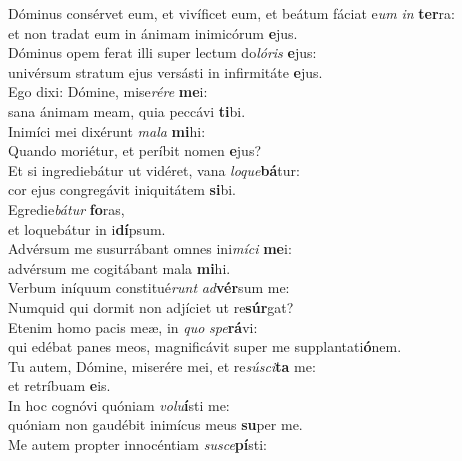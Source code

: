 \evenverse Dóminus consérvet eum, et vivíficet eum, et beátum fáciat e\textit{um} \textit{in} \textbf{ter}ra:~\*\\
\evenverse et non tradat eum in ánimam inimicórum \textbf{e}jus.\\
\oddverse Dóminus opem ferat illi super lectum do\textit{ló}\textit{ris} \textbf{e}jus:~\*\\
\oddverse univérsum stratum ejus versásti in infirmitáte \textbf{e}jus.\\
\evenverse Ego dixi: Dómine, mise\textit{ré}\textit{re} \textbf{me}i:~\*\\
\evenverse sana ánimam meam, quia peccávi \textbf{ti}bi.\\
\oddverse Inimíci mei dixérunt \textit{ma}\textit{la} \textbf{mi}hi:~\*\\
\oddverse Quando moriétur, et períbit nomen \textbf{e}jus?\\
\evenverse Et si ingrediebátur ut vidéret, vana \textit{lo}\textit{que}\textbf{bá}tur:~\*\\
\evenverse cor ejus congregávit iniquitátem \textbf{si}bi.\\
\oddverse Egredie\textit{bá}\textit{tur} \textbf{fo}ras,~\*\\
\oddverse et loquebátur in i\textbf{dí}psum.\\
\evenverse Advérsum me susurrábant omnes ini\textit{mí}\textit{ci} \textbf{me}i:~\*\\
\evenverse advérsum me cogitábant mala \textbf{mi}hi.\\
\oddverse Verbum iníquum constitué\textit{runt} \textit{ad}\textbf{vér}sum me:~\*\\
\oddverse Numquid qui dormit non adjíciet ut re\textbf{súr}gat?\\
\evenverse Etenim homo pacis meæ, in \textit{quo} \textit{spe}\textbf{rá}vi:~\*\\
\evenverse qui edébat panes meos, magnificávit super me supplantati\textbf{ó}nem.\\
\oddverse Tu autem, Dómine, miserére mei, et re\textit{sú}\textit{sci}\textbf{ta} me:~\*\\
\oddverse et retríbuam \textbf{e}is.\\
\evenverse In hoc cognóvi quóniam \textit{vo}\textit{lu}\textbf{í}sti me:~\*\\
\evenverse quóniam non gaudébit inimícus meus \textbf{su}per me.\\
\oddverse Me autem propter innocéntiam \textit{su}\textit{sce}\textbf{pí}sti:~\*\\
